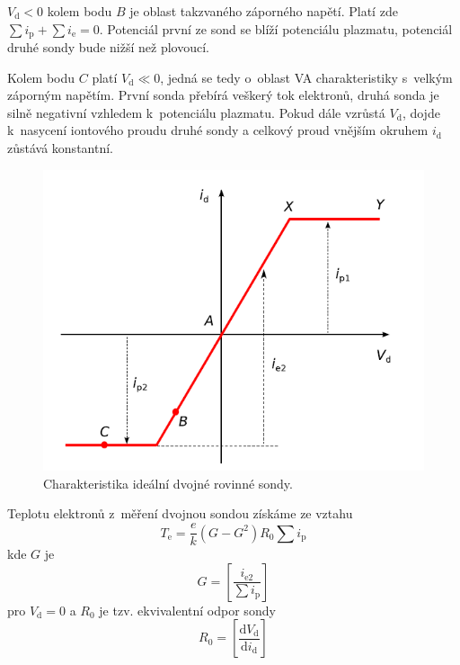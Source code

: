 \documentclass[a4paper,12pt]{article}
\begin{document}
$V_\text{{d}} < 0 $ kolem bodu $B$ je
oblast takzvaného záporného napětí. Platí zde 	
$\sum i_\text{{p}} + \sum i_\text{{e}} = 0$.
Potenciál první ze sond se blíží potenciálu plazmatu,
potenciál druhé sondy bude nižší než plovoucí.

Kolem bodu $C$ platí $V_\text{{d}} \ll 0 $, jedná se tedy
o~oblast VA charakteristiky s~velkým záporným napětím.
První sonda přebírá veškerý tok elektronů, druhá sonda
je silně negativní vzhledem k~potenciálu plazmatu.
Pokud dále vzrůstá $V_\text{{d}}$, dojde k~nasycení
iontového proudu druhé sondy a celkový proud vnějším
okruhem $i_\text{{d}}$ zůstává konstantní.

\begin{figure}[h]
	\centering
	\includegraphics[width=130mm]{charakteristikadvojna.png}
	\caption{Charakteristika ideální dvojné rovinné sondy.}
	\label{charakteristikadvojna}
\end{figure}
\newpage
Teplotu elektronů z~měření dvojnou sondou získáme ze vztahu
\begin{equation}
	T_\text{{e}} = \frac{e}{k} (G-G^2) R_0 \sum i_\text{{p}}
	\label{T}
\end{equation}
kde $G$ je 
\begin{equation}
	G = \left[ \frac{i_\text{{e2}}}{\sum i_\text{{p}}}\right] 
	\label{G}
\end{equation}
pro $V_\text{{d}} = 0$ a $R_0$ je tzv. ekvivalentní odpor sondy
\begin{equation}
	R_0 = \left[ \frac{\text{d} V_\text{d}} {\text{d}i_\text{d}}
	\right] 
	\label{R}
\end{equation}
\end{document}
